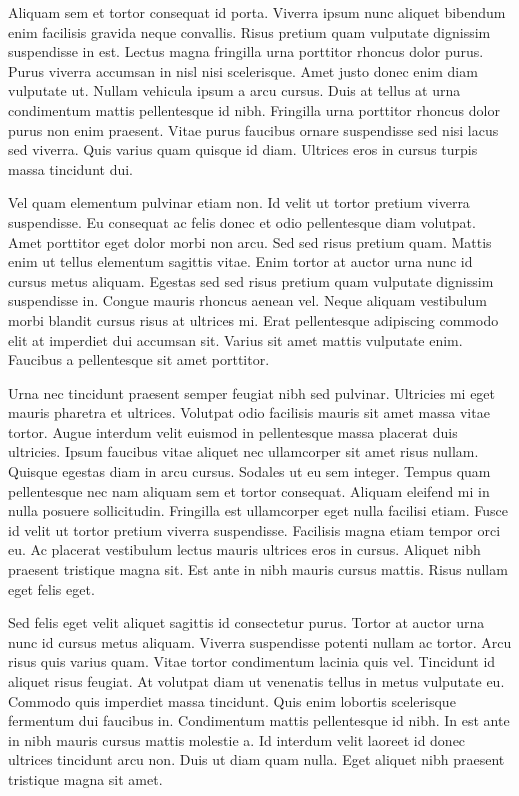 \documentclass[11pt,a4paper]{article}
\begin{document}
Aliquam sem et tortor consequat id porta. Viverra ipsum nunc aliquet bibendum enim facilisis gravida neque convallis. Risus pretium quam vulputate dignissim suspendisse in est. Lectus magna fringilla urna porttitor rhoncus dolor purus. Purus viverra accumsan in nisl nisi scelerisque. Amet justo donec enim diam vulputate ut. Nullam vehicula ipsum a arcu cursus. Duis at tellus at urna condimentum mattis pellentesque id nibh. Fringilla urna porttitor rhoncus dolor purus non enim praesent. Vitae purus faucibus ornare suspendisse sed nisi lacus sed viverra. Quis varius quam quisque id diam. Ultrices eros in cursus turpis massa tincidunt dui.

Vel quam elementum pulvinar etiam non. Id velit ut tortor pretium viverra suspendisse. Eu consequat ac felis donec et odio pellentesque diam volutpat. Amet porttitor eget dolor morbi non arcu. Sed sed risus pretium quam. Mattis enim ut tellus elementum sagittis vitae. Enim tortor at auctor urna nunc id cursus metus aliquam. Egestas sed sed risus pretium quam vulputate dignissim suspendisse in. Congue mauris rhoncus aenean vel. Neque aliquam vestibulum morbi blandit cursus risus at ultrices mi. Erat pellentesque adipiscing commodo elit at imperdiet dui accumsan sit. Varius sit amet mattis vulputate enim. Faucibus a pellentesque sit amet porttitor.

Urna nec tincidunt praesent semper feugiat nibh sed pulvinar. Ultricies mi eget mauris pharetra et ultrices. Volutpat odio facilisis mauris sit amet massa vitae tortor. Augue interdum velit euismod in pellentesque massa placerat duis ultricies. Ipsum faucibus vitae aliquet nec ullamcorper sit amet risus nullam. Quisque egestas diam in arcu cursus. Sodales ut eu sem integer. Tempus quam pellentesque nec nam aliquam sem et tortor consequat. Aliquam eleifend mi in nulla posuere sollicitudin. Fringilla est ullamcorper eget nulla facilisi etiam. Fusce id velit ut tortor pretium viverra suspendisse. Facilisis magna etiam tempor orci eu. Ac placerat vestibulum lectus mauris ultrices eros in cursus. Aliquet nibh praesent tristique magna sit. Est ante in nibh mauris cursus mattis. Risus nullam eget felis eget.

Sed felis eget velit aliquet sagittis id consectetur purus. Tortor at auctor urna nunc id cursus metus aliquam. Viverra suspendisse potenti nullam ac tortor. Arcu risus quis varius quam. Vitae tortor condimentum lacinia quis vel. Tincidunt id aliquet risus feugiat. At volutpat diam ut venenatis tellus in metus vulputate eu. Commodo quis imperdiet massa tincidunt. Quis enim lobortis scelerisque fermentum dui faucibus in. Condimentum mattis pellentesque id nibh. In est ante in nibh mauris cursus mattis molestie a. Id interdum velit laoreet id donec ultrices tincidunt arcu non. Duis ut diam quam nulla. Eget aliquet nibh praesent tristique magna sit amet.
\end{document}
